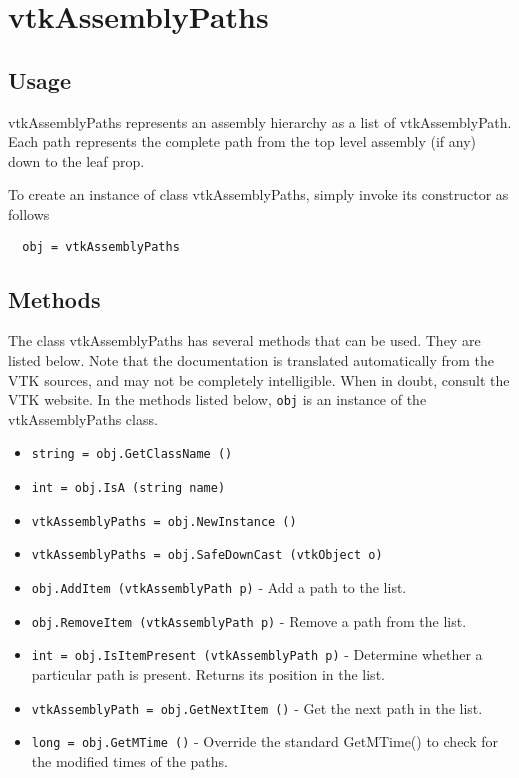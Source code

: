 \section{vtkAssemblyPaths}

\subsection{Usage}

 vtkAssemblyPaths represents an assembly hierarchy as a list of 
 vtkAssemblyPath. Each path represents the complete path from the
 top level assembly (if any) down to the leaf prop.

To create an instance of class vtkAssemblyPaths, simply
invoke its constructor as follows
\begin{verbatim}
  obj = vtkAssemblyPaths
\end{verbatim}
\subsection{Methods}

The class vtkAssemblyPaths has several methods that can be used.
  They are listed below.
Note that the documentation is translated automatically from the VTK sources,
and may not be completely intelligible.  When in doubt, consult the VTK website.
In the methods listed below, \verb|obj| is an instance of the vtkAssemblyPaths class.
\begin{itemize}
\item  \verb|string = obj.GetClassName ()|

\item  \verb|int = obj.IsA (string name)|

\item  \verb|vtkAssemblyPaths = obj.NewInstance ()|

\item  \verb|vtkAssemblyPaths = obj.SafeDownCast (vtkObject o)|

\item  \verb|obj.AddItem (vtkAssemblyPath p)| -  Add a path to the list.

\item  \verb|obj.RemoveItem (vtkAssemblyPath p)| -  Remove a path from the list.

\item  \verb|int = obj.IsItemPresent (vtkAssemblyPath p)| -  Determine whether a particular path is present. Returns its position
 in the list.

\item  \verb|vtkAssemblyPath = obj.GetNextItem ()| -  Get the next path in the list.

\item  \verb|long = obj.GetMTime ()| -  Override the standard GetMTime() to check for the modified times
 of the paths.

\end{itemize}
